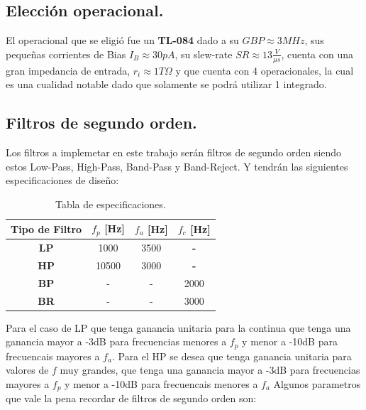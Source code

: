 \subsection{Elección operacional.}
El operacional que se eligió fue un \textbf{TL-084} dado a su $GBP \approx 3MHz$, sus pequeñas corrientes de Bias $I_B \approx 30pA$, su slew-rate $SR \approx 13 \frac{V}{\mu s}$, cuenta con una gran impedancia de entrada, $ r_i \approx 1T \Omega $ y que cuenta con 4 operacionales, la cual es una cualidad notable dado que solamente se podrá utilizar 1 integrado.

 \flushleft
\subsection{Filtros de segundo orden.}
Los filtros a implemetar en este trabajo serán filtros de segundo orden siendo estos Low-Pass, High-Pass, Band-Pass y Band-Reject. Y tendrán las siguientes especificaciones de diseño:
\begin{table}[H]
\begin{center}
\begin{tabular}{|c|c|c|c|}
\hline
\textbf{Tipo de Filtro} & \textbf{$f_p$ [Hz]} & \textbf{$f_a$ [Hz]} & \textbf{$f_c$ [Hz]} \\ \hline
\textbf{LP}             & 1000                & 3500                & \textbf{-}          \\ \hline
\textbf{HP}             & 10500               & 3000                & \textbf{-}          \\ \hline
\textbf{BP}             & -                   & -                   & 2000                \\ \hline
\textbf{BR}             & -                   & -                   & 3000                \\ \hline
\end{tabular}
\caption{Tabla de especificaciones.}
\label{tab:specs}
\end{center}
\end{table}
Para el caso de LP que tenga ganancia unitaria para la continua que tenga una ganancia mayor a -3dB para frecuencias menores a $f_p$ y menor a -10dB para frecuencais mayores a $f_a$. Para el HP se desea que tenga ganancia unitaria para valores de $f$ muy grandes, que tenga una ganancia mayor a -3dB para frecuencias mayores a $f_p$ y menor a -10dB para frecuencais menores a $f_a$
Algunos parametros que vale la pena recordar de filtros de segundo orden son:
